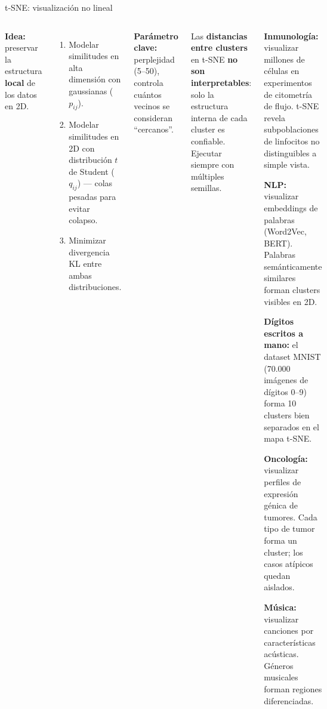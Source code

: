 \documentclass[aspectratio=169]{beamer}
\begin{document}
\begin{frame}{t-SNE: visualización no lineal}
\begin{columns}[T]
\textbf{Idea:} preservar la estructura \textbf{local} de los datos en 2D.

\medskip
\begin{enumerate}
  \item Modelar similitudes en alta dimensión con gaussianas ($p_{ij}$).
  \item Modelar similitudes en 2D con distribución $t$ de Student ($q_{ij}$) --- colas pesadas para evitar colapso.
  \item Minimizar divergencia KL entre ambas distribuciones.
\end{enumerate}

\medskip
\textbf{Parámetro clave:} perplejidad (5--50), controla cuántos vecinos se consideran ``cercanos''.

\medskip
\begin{atencion}
Las \textbf{distancias entre clusters} en t-SNE \textbf{no son interpretables}: solo la estructura interna de cada cluster es confiable. Ejecutar siempre con múltiples semillas.
\end{atencion}

\begin{aplicacion}
\textbf{Inmunología:} visualizar millones de células en experimentos de citometría de flujo. t-SNE revela subpoblaciones de linfocitos no distinguibles a simple vista.

\medskip
\textbf{NLP:} visualizar embeddings de palabras (Word2Vec, BERT). Palabras semánticamente similares forman clusters visibles en 2D.

\medskip
\textbf{Dígitos escritos a mano:} el dataset MNIST (70.000 imágenes de dígitos 0--9) forma 10 clusters bien separados en el mapa t-SNE.

\medskip
\textbf{Oncología:} visualizar perfiles de expresión génica de tumores. Cada tipo de tumor forma un cluster; los casos atípicos quedan aislados.

\medskip
\textbf{Música:} visualizar canciones por características acústicas. Géneros musicales forman regiones diferenciadas.
\end{aplicacion}
\end{columns}
\end{frame}
\end{document}
